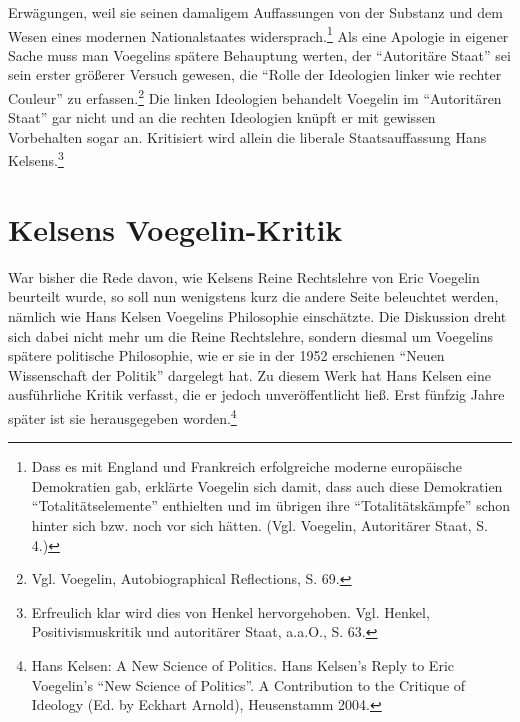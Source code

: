 \documentclass[12pt,a4paper,ngerman]{article}
\begin{document}
Erwägungen, weil sie seinen damaligem Auffassungen von der Substanz und dem
Wesen eines modernen Nationalstaates widersprach.\footnote{Dass es mit England
  und Frankreich erfolgreiche moderne europäische Demokratien gab, erklärte
  Voegelin sich damit, dass auch diese Demokratien "`Totalitätselemente"'
  enthielten und im übrigen ihre "`Totalitätskämpfe"' schon hinter sich bzw.
  noch vor sich hätten.  (Vgl.  Voegelin, Autoritärer Staat, S. 4.) } Als eine
Apologie in eigener Sache muss man Voegelins spätere Behauptung werten, der
"`Autoritäre Staat"' sei sein erster größerer Versuch gewesen, die "`Rolle der
Ideologien linker wie rechter Couleur"' zu erfassen.\footnote{Vgl.  Voegelin,
  Autobiographical Reflections, S. 69.}  Die linken Ideologien behandelt
Voegelin im "`Autoritären Staat"' gar nicht und an die rechten Ideologien
knüpft er mit gewissen Vorbehalten sogar an.  Kritisiert wird allein die
liberale Staatsauffassung Hans Kelsens.\footnote{Erfreulich klar wird dies von
  Henkel hervorgehoben.  Vgl.  Henkel, Positivismuskritik und autoritärer
  Staat, a.a.O., S.  63.}


\section{Kelsens Voegelin-Kritik}

War bisher die Rede davon, wie Kelsens Reine Rechtslehre von Eric Voegelin
beurteilt wurde, so soll nun wenigstens kurz die andere Seite beleuchtet
werden, nämlich wie Hans Kelsen Voegelins Philosophie einschätzte. Die
Diskussion dreht sich dabei nicht mehr um die Reine Rechtslehre, sondern
diesmal um Voegelins spätere politische Philosophie, wie er sie in der 1952
erschienen "`Neuen Wissenschaft der Politik"' dargelegt hat. Zu diesem Werk
hat Hans Kelsen eine ausführliche Kritik verfasst, die er jedoch
unveröffentlicht ließ.  Erst fünfzig Jahre später ist sie herausgegeben
worden.\footnote{Hans Kelsen: A New Science of Politics. Hans Kelsen's Reply
  to Eric Voegelin's "`New Science of Politics"'. A Contribution to the
  Critique of Ideology (Ed. by Eckhart Arnold), Heusenstamm 2004.}
\end{document}
